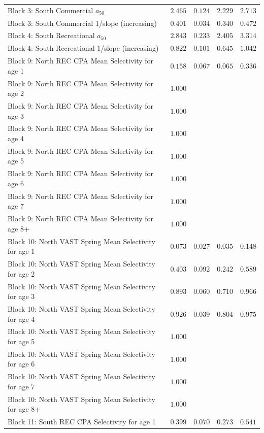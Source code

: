 \documentclass[
]{article}
\begin{document}
\begin{landscape}
\begin{longtable}[t]{lrrrr}
\addlinespace
Block 3: South Commercial $a_{50}$ & $2.465$ & $0.124$ & $2.229$ & $2.713$\\
Block 3: South Commercial 1/slope (increasing) & $0.401$ & $0.034$ & $0.340$ & $0.472$\\
Block 4: South Recreational $a_{50}$ & $2.843$ & $0.233$ & $2.405$ & $3.314$\\
Block 4: South Recreational 1/slope (increasing) & $0.822$ & $0.101$ & $0.645$ & $1.042$\\
Block 9: North REC CPA Mean Selectivity for age 1 & $0.158$ & $0.067$ & $0.065$ & $0.336$\\
\addlinespace
Block 9: North REC CPA Mean Selectivity for age 2 & $1.000$ &  &  & \\
Block 9: North REC CPA Mean Selectivity for age 3 & $1.000$ &  &  & \\
Block 9: North REC CPA Mean Selectivity for age 4 & $1.000$ &  &  & \\
Block 9: North REC CPA Mean Selectivity for age 5 & $1.000$ &  &  & \\
Block 9: North REC CPA Mean Selectivity for age 6 & $1.000$ &  &  & \\
\addlinespace
Block 9: North REC CPA Mean Selectivity for age 7 & $1.000$ &  &  & \\
Block 9: North REC CPA Mean Selectivity for age 8+ & $1.000$ &  &  & \\
Block 10: North VAST Spring Mean Selectivity for age 1 & $0.073$ & $0.027$ & $0.035$ & $0.148$\\
Block 10: North VAST Spring Mean Selectivity for age 2 & $0.403$ & $0.092$ & $0.242$ & $0.589$\\
Block 10: North VAST Spring Mean Selectivity for age 3 & $0.893$ & $0.060$ & $0.710$ & $0.966$\\
\addlinespace
Block 10: North VAST Spring Mean Selectivity for age 4 & $0.926$ & $0.039$ & $0.804$ & $0.975$\\
Block 10: North VAST Spring Mean Selectivity for age 5 & $1.000$ &  &  & \\
Block 10: North VAST Spring Mean Selectivity for age 6 & $1.000$ &  &  & \\
Block 10: North VAST Spring Mean Selectivity for age 7 & $1.000$ &  &  & \\
Block 10: North VAST Spring Mean Selectivity for age 8+ & $1.000$ &  &  & \\
\addlinespace
Block 11: South REC CPA Selectivity for age 1 & $0.399$ & $0.070$ & $0.273$ & $0.541$\\

\end{longtable}
\end{landscape}
\end{document}
